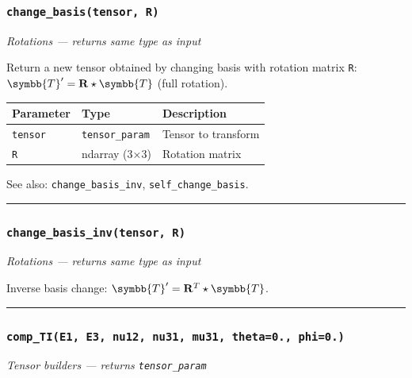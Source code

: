\documentclass[
  a4paper,
  numbers=noendperiod,
  DIV=12]{scrreprt}
\newcounter{none} %
\newcommand{\uuuu}[1]{{\symbb{{#1}}}}
\begin{document}
\subsubsection{\texorpdfstring{\texttt{change\_basis(tensor,\ R)}}{change\_basis(tensor, R)}}\label{api-change-basis}

\emph{Rotations --- returns same type as input}

Return a new tensor obtained by changing basis with rotation matrix
\texttt{R}: \(\uuuu{T}' = \mathbf{R} \star \uuuu{T}\) (full rotation).

{\def\LTcaptype{none} %
\begin{longtable}[]{@{}lll@{}}
\toprule\noalign{}
Parameter & Type & Description \\
\midrule\noalign{}
\endhead
\bottomrule\noalign{}
\endlastfoot
\texttt{tensor} & \texttt{tensor\_param} & Tensor to transform \\
\texttt{R} & ndarray (3×3) & Rotation matrix \\
\end{longtable}
}

See also: \texttt{change\_basis\_inv}, \texttt{self\_change\_basis}.

\begin{center}\rule{0.5\linewidth}{0.5pt}\end{center}

\subsubsection{\texorpdfstring{\texttt{change\_basis\_inv(tensor,\ R)}}{change\_basis\_inv(tensor, R)}}\label{api-change-basis-inv}

\emph{Rotations --- returns same type as input}

Inverse basis change: \(\uuuu{T}' = \mathbf{R}^T \star \uuuu{T}\).

\begin{center}\rule{0.5\linewidth}{0.5pt}\end{center}

\subsubsection{\texorpdfstring{\texttt{comp\_TI(E1,\ E3,\ nu12,\ nu31,\ mu31,\ theta=0.,\ phi=0.)}}{comp\_TI(E1, E3, nu12, nu31, mu31, theta=0., phi=0.)}}\label{api-comp-ti}

\emph{Tensor builders --- returns \texttt{tensor\_param}}
\end{document}
